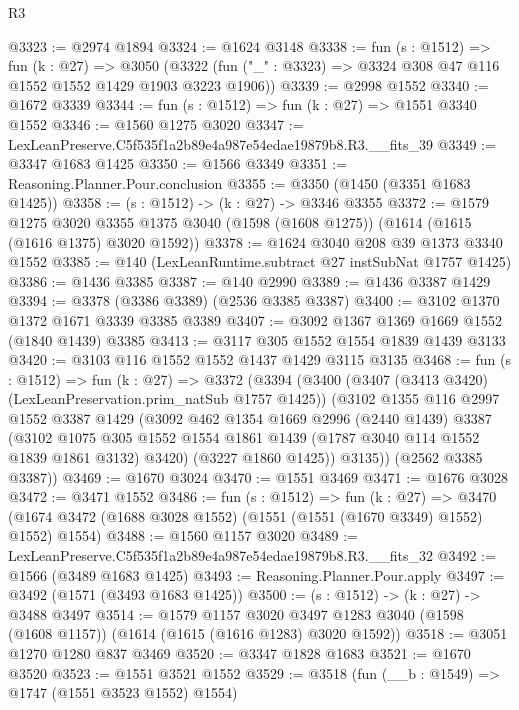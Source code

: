 \begin{lexlean}{R3}
\begin{coremodule}
@3323 := @2974 @1894
@3324 := @1624 @3148
@3338 := fun (s : @1512) =>
  fun (k : @27) =>
  @3050 (@3322 (fun ("_" : @3323) => @3324 @308 @47 @116 @1552 @1552 @1429 @1903 @3223 @1906))
@3339 := @2998 @1552
@3340 := @1672 @3339
@3344 := fun (s : @1512) => fun (k : @27) => @1551 @3340 @1552
@3346 := @1560 @1275 @3020
@3347 := LexLeanPreserve.C5f535f1a2b89e4a987e54edae19879b8.R3.__fits_39
@3349 := @3347 @1683 @1425
@3350 := @1566 @3349
@3351 := Reasoning.Planner.Pour.conclusion
@3355 := @3350 (@1450 (@3351 @1683 @1425))
@3358 := (s : @1512) -> (k : @27) -> @3346 @3355
@3372 := @1579
    @1275
    @3020
    @3355
    @1375
    @3040
    (@1598 (@1608 @1275))
    (@1614 (@1615 (@1616 @1375) @3020 @1592))
@3378 := @1624 @3040 @208 @39 @1373 @3340 @1552
@3385 := @140 (LexLeanRuntime.subtract @27 instSubNat @1757 @1425)
@3386 := @1436 @3385
@3387 := @140 @2990
@3389 := @1436 @3387 @1429
@3394 := @3378 (@3386 @3389) (@2536 @3385 @3387)
@3400 := @3102 @1370 @1372 @1671 @3339 @3385 @3389
@3407 := @3092 @1367 @1369 @1669 @1552 (@1840 @1439) @3385
@3413 := @3117 @305 @1552 @1554 @1839 @1439 @3133
@3420 := @3103 @116 @1552 @1552 @1437 @1429 @3115 @3135
@3468 := fun (s : @1512) =>
  fun (k : @27) =>
  @3372
    (@3394
      (@3400
        (@3407 (@3413 @3420) (LexLeanPreservation.prim_natSub @1757 @1425))
        (@3102
          @1355
          @116
          @2997
          @1552
          @3387
          @1429
          (@3092
            @462
            @1354
            @1669
            @2996
            (@2440 @1439)
            @3387
            (@3102
              @1075
              @305
              @1552
              @1554
              @1861
              @1439
              (@1787 @3040 @114 @1552 @1839 @1861 @3132)
              @3420)
            (@3227 @1860 @1425))
          @3135))
      (@2562 @3385 @3387))
@3469 := @1670 @3024
@3470 := @1551 @3469
@3471 := @1676 @3028
@3472 := @3471 @1552
@3486 := fun (s : @1512) =>
  fun (k : @27) =>
  @3470 (@1674 @3472 (@1688 @3028 @1552) (@1551 (@1551 (@1670 @3349) @1552) @1552) @1554)
@3488 := @1560 @1157 @3020
@3489 := LexLeanPreserve.C5f535f1a2b89e4a987e54edae19879b8.R3.__fits_32
@3492 := @1566 (@3489 @1683 @1425)
@3493 := Reasoning.Planner.Pour.apply
@3497 := @3492 (@1571 (@3493 @1683 @1425))
@3500 := (s : @1512) -> (k : @27) -> @3488 @3497
@3514 := @1579
    @1157
    @3020
    @3497
    @1283
    @3040
    (@1598 (@1608 @1157))
    (@1614 (@1615 (@1616 @1283) @3020 @1592))
@3518 := @3051 @1270 @1280 @837 @3469
@3520 := @3347 @1828 @1683
@3521 := @1670 @3520
@3523 := @1551 @3521 @1552
@3529 := @3518 (fun (__b : @1549) => @1747 (@1551 @3523 @1552) @1554)

\end{coremodule}
\end{lexlean}
